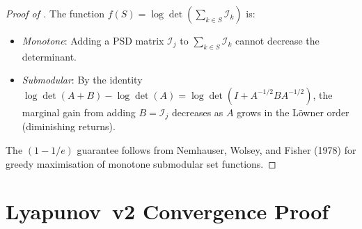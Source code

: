 \documentclass{article}
\begin{document}
\begin{proof}[Proof of ]
The function $f(S) = \log\det(\sum_{k \in S} \mathcal{I}_k)$ is:
\begin{itemize}
    \item \emph{Monotone}: Adding a PSD matrix $\mathcal{I}_j$ to $\sum_{k \in S} \mathcal{I}_k$ cannot decrease the determinant.
    \item \emph{Submodular}: By the identity $\log\det(A+B) - \log\det(A) = \log\det(I + A^{-1/2}BA^{-1/2})$, the marginal gain from adding $B = \mathcal{I}_j$ decreases as $A$ grows in the L\"{o}wner order (diminishing returns).
\end{itemize}
The $(1-1/e)$ guarantee follows from Nemhauser, Wolsey, and Fisher (1978) for greedy maximisation of monotone submodular set functions.
\end{proof}

\section{Lyapunov~v2 Convergence Proof}
\label{app:lyapunov_proof}
\end{document}
